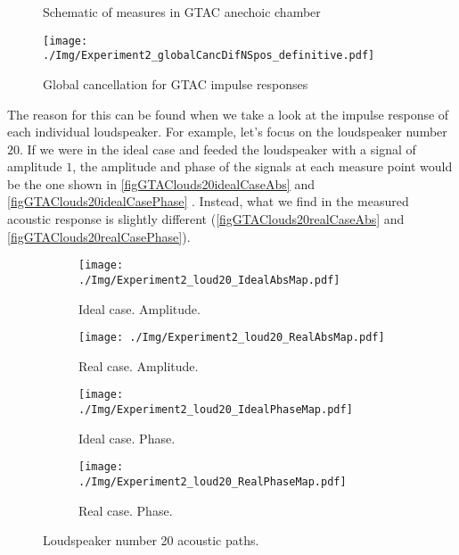 \begin{figure}[H]
	\begin{minipage}[b]{0.49\textwidth}
		\centering
		\caption[Schematic of measures in GTAC anechoic chamber]{Schematic of measures in GTAC anechoic chamber}
		\label{GTAC360micro}
	\end{minipage}
	\begin{minipage}[b]{0.49\textwidth}
	\centering
	\texttt{[image: ./Img/Experiment2\_globalCancDifNSpos\_definitive.pdf]}	
	\caption[Global cancellation for GTAC impulse responses]{Global cancellation for GTAC impulse responses}
	\label{figGTACglobalCancAlltogether}
\end{minipage}
\end{figure}

The reason for this can be found when we take a look at the impulse response of each individual loudspeaker. For example, let's focus on the loudspeaker number $20$. If we were in the ideal case and feeded the loudspeaker with a signal of amplitude $1$, the amplitude and phase of the signals at each measure point would be the one shown in \autoref{figGTAClouds20idealCaseAbs} and \autoref{figGTAClouds20idealCasePhase} . Instead, what we find in the measured acoustic response is slightly different (\autoref{figGTAClouds20realCaseAbs} and \autoref{figGTAClouds20realCasePhase}).

\begin{figure}[H]
	\centering
	\begin{subfigure}[b]{0.24\textwidth}
		\centering
		\texttt{[image: ./Img/Experiment2\_loud20\_IdealAbsMap.pdf]}
		\caption{Ideal case. Amplitude.}
		\label{figGTAClouds20idealCaseAbs}
	\end{subfigure}
		\begin{subfigure}[b]{0.24\textwidth}
		\centering
		\texttt{[image: ./Img/Experiment2\_loud20\_RealAbsMap.pdf]}
		\caption{Real case. Amplitude.}
		\label{figGTAClouds20idealCasePhase}		
	\end{subfigure}
	\begin{subfigure}[b]{0.24\textwidth}
		\centering
		\texttt{[image: ./Img/Experiment2\_loud20\_IdealPhaseMap.pdf]}
		\caption{Ideal case. Phase.}
		\label{figGTAClouds20realCaseAbs}
	\end{subfigure}
	\begin{subfigure}[b]{0.24\textwidth}
		\centering
		\texttt{[image: ./Img/Experiment2\_loud20\_RealPhaseMap.pdf]}
		\caption{Real case. Phase.}
		\label{figGTAClouds20realCasePhase}
	\end{subfigure}
	\caption{Loudspeaker number 20 acoustic paths.}
	\label{figGTAClouds20}
\end{figure}

